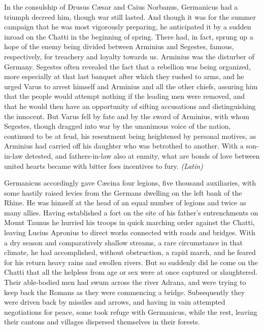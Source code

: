 
In the consulship of Drusus Cæsar and Caius Norbanus, Germanicus had a triumph decreed him, though war still lasted. And though it was for the summer campaign that he was most vigorously preparing, he anticipated it by a sudden inroad on the Chatti in the beginning of spring. There had, in fact, sprung up a hope of the enemy being divided between Arminius and Segestes, famous, respectively, for treachery and loyalty towards us. Arminius was the disturber of Germany. Segestes often revealed the fact that a rebellion was being organized, more especially at that last banquet after which they rushed to arms, and he urged Varus to arrest himself and Arminius and all the other chiefs, assuring him that the people would attempt nothing if the leading men were removed, and that he would then have an opportunity of sifting accusations and distinguishing the innocent. But Varus fell by fate and by the sword of Arminius, with whom Segestes, though dragged into war by the unanimous voice of the nation, continued to be at feud, his resentment being heightened by personal motives, as Arminius had carried off his daughter who was betrothed to another. With a son-in-law detested, and fathers-in-law also at enmity, what are bonds of love between united hearts became with bitter foes incentives to fury. \emph{(Latin)}


Germanicus accordingly gave Cæcina four legions, five thousand auxiliaries, with some hastily raised levies from the Germans dwelling on the left bank of the Rhine. He was himself at the head of an equal number of legions and twice as many allies. Having established a fort on the site of his father's entrenchments on Mount Taunus he hurried his troops in quick marching order against the Chatti, leaving Lucius Apronius to direct works connected with roads and bridges. With a dry season and comparatively shallow streams, a rare circumstance in that climate, he had accomplished, without obstruction, a rapid march, and he feared for his return heavy rains and swollen rivers. But so suddenly did he come on the Chatti that all the helpless from age or sex were at once captured or slaughtered. Their able-bodied men had swum across the river Adrana, and were trying to keep back the Romans as they were commencing a bridge. Subsequently they were driven back by missiles and arrows, and having in vain attempted negotiations for peace, some took refuge with Germanicus, while the rest, leaving their cantons and villages dispersed themselves in their forests.


